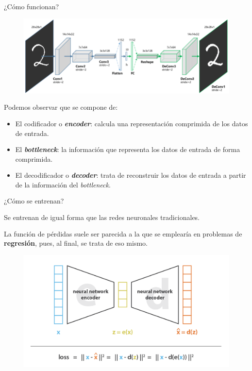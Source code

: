 \begin{frame}{¿Cómo funcionan?}

\begin{figure}
    \centering
    \includegraphics[width=.7\textwidth]{Slides/figures/02_Metodos_Generativos/cnn-ae-adv.png}
\end{figure}

Podemos observar que se compone de:
\begin{itemize}
    \item El codificador o \textit{\textbf{encoder}}: calcula una representación comprimida de los datos de entrada.
    \item El \textbf{\textit{bottleneck}}: la información que representa los datos de entrada de forma comprimida.
    \item El decodificador o \textit{\textbf{decoder}}: trata de reconstruir los datos de entrada a partir de la información del \textit{bottleneck}.
\end{itemize}
\end{frame}


\begin{frame}{¿Cómo se entrenan?}

Se entrenan de igual forma que las redes neuronales tradicionales.

La función de pérdidas suele ser parecida a la que se emplearía en problemas de \textbf{regresión}, pues, al final, se trata de eso mismo.

\begin{figure}
    \centering
    \includegraphics[width=.7\textwidth]{Slides/figures/02_Metodos_Generativos/cnn-ae-loss.png}
\end{figure}

\end{frame}


